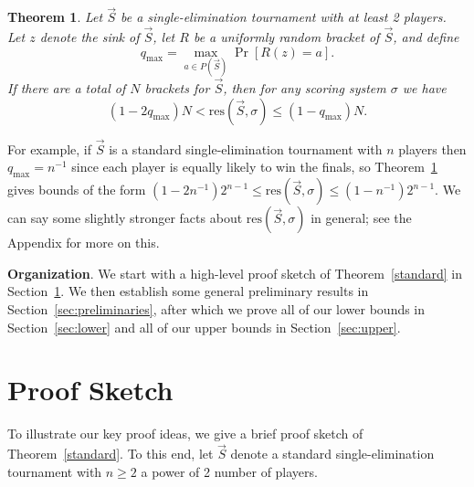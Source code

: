 \documentclass[12pt,letterpaper]{article}
\newtheorem{thm}{Theorem}[section]
\theoremstyle{definition}
\newcommand{\sig}{\sigma}
\newcommand{\ep}{\varepsilon}
\newcommand{\half}{\frac{1}{2}}
\renewcommand{\1}{\mathbbm{1}}
\newcommand{\tour}{\vec{S}}
\newcommand{\res}{\mathrm{res}}
\begin{document}
\begin{thm}\label{resolving with qmax alone}
	Let $\tour$ be a single-elimination tournament with at least 2 players.   Let $z$ denote the sink of $\tour$, let $R$ be a uniformly random bracket of $\tour$, and define
	\[q_{\max}=\max_{a\in P(\tour)}\Pr[R(z)=a].\]
	If there are a total of $N$ brackets for $\tour$, then for any scoring system $\sig$ we have
	\[(1-2q_{\mathrm{max}})N< \res(\tour,\sig)\le (1-q_{\max})N.\]
\end{thm}
For example, if $\tour$ is a standard single-elimination tournament with $n$ players then $q_{\max}=n^{-1}$ since each player is equally likely to win the finals, so Theorem~\ref{resolving with qmax alone} gives bounds of the form $(1-2n^{-1})2^{n-1}\le \res(\tour,\sig)\le (1-n^{-1})2^{n-1}$.  We can say some slightly stronger facts about $\res(\tour,\sig)$ in general; see the Appendix for more on this.






\textbf{Organization}.  We start with a high-level proof sketch of Theorem~\ref{standard} in Section~\ref{sec:sketch}.  We then establish some general preliminary results in Section~\ref{sec:preliminaries}, after which we prove all of our lower bounds  in Section~\ref{sec:lower} and all of our upper bounds in Section~\ref{sec:upper}.

\section{Proof Sketch}\label{sec:sketch}
To illustrate our key proof ideas, we give a brief proof sketch of Theorem~\ref{standard}.  To this end, let $\tour$ denote a standard single-elimination tournament with $n\ge 2$ a power of 2 number of players.
\end{document}
